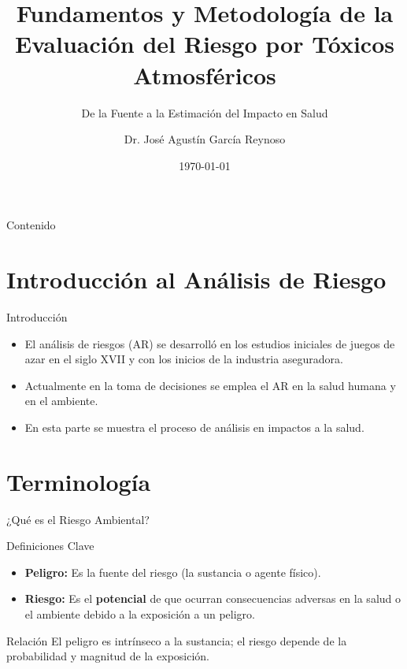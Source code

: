 \documentclass[10pt,compress]{beamer}
\title[Evaluación de Riesgo]{Fundamentos y Metodología de la Evaluación del Riesgo por Tóxicos Atmosféricos}
\subtitle{De la Fuente a la Estimación del Impacto en Salud}
\author[Dr. Agustin García]{Dr. José Agustín García Reynoso}
\institute[ICAyCC]{Instituto de Ciencias de la Atmósfera y Cambio Climático, UNAM}
\date{\today}
\begin{document}
\begin{frame}
\titlepage
\end{frame}

\begin{frame}{Contenido}
\tableofcontents
\end{frame}

\section{Introducción al Análisis de Riesgo}
\begin{frame}{Introducción}
\begin{itemize}
\item El análisis de riesgos (AR) se desarrolló en los estudios iniciales de juegos de azar en el siglo XVII y con los inicios de la industria aseguradora.
\item Actualmente en la toma de decisiones se emplea el AR en la salud humana y en el ambiente.
\item En esta parte se muestra el proceso de análisis en impactos a la salud.
\end{itemize}
\end{frame}

\section{Terminología}
\begin{frame}{¿Qué es el Riesgo Ambiental?}
    \begin{block}{Definiciones Clave}
        \begin{itemize}
            \item \textbf{Peligro:} Es la fuente del riesgo (la sustancia o agente físico).
            \item \textbf{Riesgo:} Es el \textbf{potencial} de que ocurran consecuencias adversas en la salud o el ambiente debido a la exposición a un peligro.
        \end{itemize}
    \end{block}
    \begin{exampleblock}{Relación}
        El peligro es intrínseco a la sustancia; el riesgo depende de la probabilidad y magnitud de la exposición.
    \end{exampleblock}
\end{frame}
\end{document}
